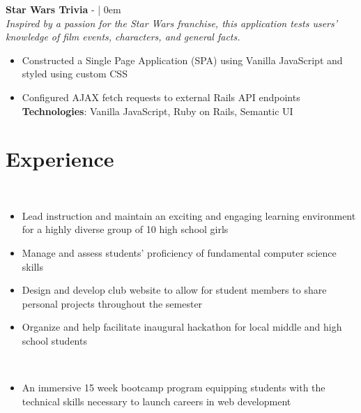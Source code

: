 \documentclass[letterpaper]{twentysecondcv} %
\begin{document}
\begin{flushleft}
\textbf{Star Wars Trivia} - |{}
{\href{http://www.localxchange.ca/}{}}
\openup 0em
\\
\textit {Inspired by a passion for the Star Wars franchise, this application tests users’ knowledge of film events, characters, and general facts.}
\vspace{-2mm}
\begin{itemize}
    \setlength\itemsep{-0.5em}
    \item Constructed a Single Page Application (SPA) using Vanilla JavaScript and styled using custom CSS
    \item Configured AJAX fetch requests to external Rails API endpoints
    \\
    \textbf{Technologies}: Vanilla JavaScript, Ruby on Rails, Semantic UI
\end{itemize}



\section{Experience}

\noindent{}\textbox{\hfil  \hfil}
\\
\vspace{-2mm}
\begin{itemize}
    \setlength\itemsep{-0.5em}
    \item Lead instruction and maintain an exciting and engaging learning environment for a highly diverse group of 10 high school girls
    \item Manage and assess students’ proficiency of fundamental computer science skills
    \item Design and develop club website to allow for student members to share personal projects throughout the semester
    \item Organize and help facilitate inaugural hackathon for local middle and high school students 
\end{itemize}

\noindent{}\textbox{\hfil  \hfil}
\\
\vspace{-2mm}
\begin{itemize}
    \setlength\itemsep{-0.5em}
    \item An immersive 15 week bootcamp program equipping students with the technical skills necessary to launch careers in web development
\end{itemize}


\end{flushleft}
\end{document}
